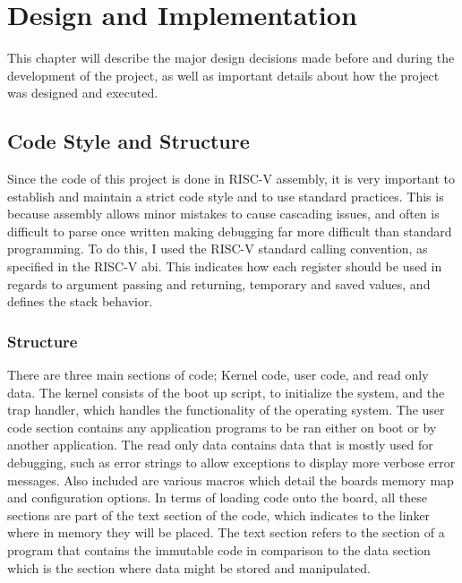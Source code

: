 \chapter{Design and Implementation}
\label{cha:design}
This chapter will describe the major design decisions made before and during the development of the project, as well as important details about how the project was designed and executed.
\section{Code Style and Structure}
Since the code of this project is done in RISC-V assembly, it is very important to establish and maintain a strict code style and to use standard practices. This is because assembly allows minor mistakes to cause cascading issues, and often is difficult to parse once written making debugging far more difficult than standard programming. To do this, I used the RISC-V standard calling convention, as specified in the RISC-V \ac{abi}. This indicates how each register should be used in regards to argument passing and returning, temporary and saved values, and defines the stack behavior\cite{riscv_abi}.
\subsection{Structure}
There are three main sections of code; Kernel code, user code, and read only data. The kernel consists of the boot up script, to initialize the system, and the trap handler, which handles the functionality of the operating system. The user code section contains any application programs to be ran either on boot or by another application. The read only data contains data that is mostly used for debugging, such as error strings to allow exceptions to display more verbose error messages. Also included are various macros which detail the boards memory map and configuration options. In terms of loading code onto the board, all these sections are part of the text section of the code, which indicates to the linker where in memory they will be placed. The text section refers to the section of a program that contains the immutable code in comparison to the data section which is the section where data might be stored and manipulated.
